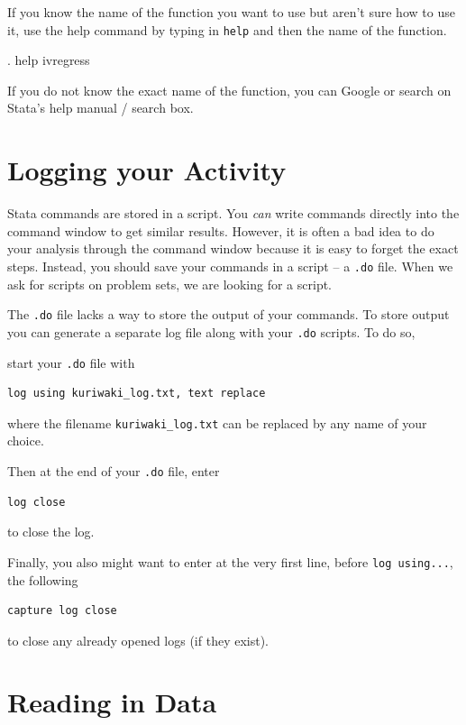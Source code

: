\documentclass[]{article}
\begin{document}
If you know the name of the function you want to use but aren't sure how
to use it, use the help command by typing in \texttt{help} and then the
name of the function.

\begin{stlog}
. help ivregress
{\smallskip}
\end{stlog}

If you do not know the exact name of the function, you can Google or
search on Stata's help manual / search box.

\section{Logging your Activity}\label{logging-your-activity}

Stata commands are stored in a script. You \emph{can} write commands
directly into the command window to get similar results. However, it is
often a bad idea to do your analysis through the command window because
it is easy to forget the exact steps. Instead, you should save your
commands in a script -- a \texttt{.do} file. When we ask for scripts on
problem sets, we are looking for a script.

The \texttt{.do} file lacks a way to store the output of your commands.
To store output you can generate a separate log file along with your
\texttt{.do} scripts. To do so,

start your \texttt{.do} file with

\begin{verbatim}
log using kuriwaki_log.txt, text replace
\end{verbatim}

where the filename \texttt{kuriwaki\_log.txt} can be replaced by any
name of your choice.

Then at the end of your \texttt{.do} file, enter

\begin{verbatim}
log close
\end{verbatim}

to close the log.

Finally, you also might want to enter at the very first line, before
\texttt{log\ using...}, the following

\begin{verbatim}
capture log close
\end{verbatim}

to close any already opened logs (if they exist).

\section{Reading in Data}\label{reading-in-data}
\end{document}
